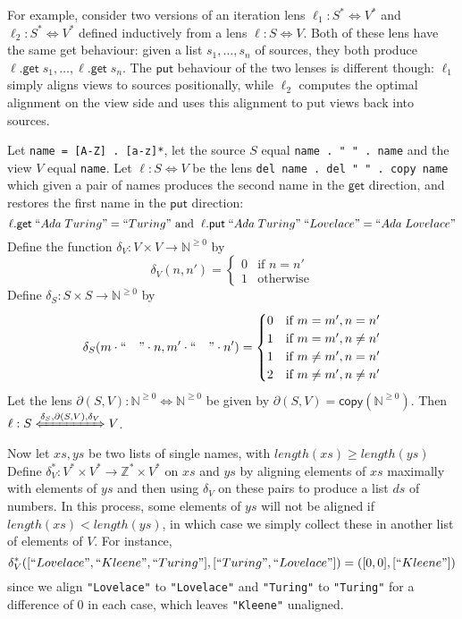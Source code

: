 \documentclass[acmsmall,review,anonymous]{acmart}\settopmatter{printfolios=true,printccs=false,printacmref=false}
\theoremstyle{definition}
\newcommand{\kw}[1]{\ensuremath{\mathsf{#1}}\xspace}
\newcommand{\get}{\ensuremath{\kw{get}}\xspace}
\newcommand{\pput}{\ensuremath{\kw{put}}\xspace}
\newcommand{\ccopy}{\ensuremath{\kw{copy}}\xspace}
\begin{document}
For example, consider two versions of an iteration lens $\ell_1 : S^*
\Leftrightarrow V^*$ and $\ell_2 : S^* \Leftrightarrow V^*$ defined inductively
from a lens $\ell : S \Leftrightarrow V$. Both of these lens have the same get
behaviour: given a list $s_1, \ldots, s_n$ of sources, they both produce
$\ell.\get \; s_1, \ldots, \ell.\get \; s_n$. The \pput behaviour of the two
lenses is different though: $\ell_1$ simply aligns views to sources
positionally, while $\ell_2$ computes the optimal alignment on the view side and
uses this alignment to put views back into sources.

Let \lstinline|name = [A-Z] . [a-z]*|, let the source $S$ equal 
\lstinline|name . " " . name| and the view $V$ equal \lstinline|name|.
Let $\ell : S \Leftrightarrow V$ be the lens
\lstinline|del name . del " " . copy name| which given a pair of names produces
the second name in the \get direction, and restores the first name in the \pput
direction:
$$\ell.\get \; ``Ada \; Turing" = ``Turing" \text{ and }\; \ell.\pput \; ``Ada
\; Turing" \; ``Lovelace" = ``Ada \; Lovelace"$$
Define the
function $\delta_V : V \times V \longrightarrow \mathbb{N}^{\geq 0}$ by 
$$\delta_V(n, n') = 
\begin{cases}
0 & \text{if }n=n'\\
1 & \text{otherwise}
\end{cases}$$
Define $\delta_S : S \times S \longrightarrow \mathbb{N}^{\geq 0}$ by
$$\delta_S(m \cdot `` \quad " \cdot n, m' \cdot `` \quad " \cdot n') =
\begin{cases}
0 & \text{if } m = m', n = n'\\
1 & \text{if } m = m', n \neq n'\\
1 & \text{if } m \neq m', n = n'\\
2 & \text{if } m \neq m', n \neq n'
\end{cases}$$
Let the lens $\partial(S, V) : \mathbb{N}^{\geq 0} \Leftrightarrow
\mathbb{N}^{\geq 0}$ be given by $\partial(S, V) = \ccopy(\mathbb{N}^{\geq
0})$. Then $\ell : S \xLeftrightarrow{\delta_S, \partial(S, V), \delta_V} V$.

Now let $xs, ys$ be two lists of single names, with $length(xs) \geq length(ys)$
Define $\delta_V^* : V^* \times V^* \longrightarrow \mathbb{Z}^* \times V^*$ on $xs$ and
$ys$ by aligning elements of $xs$ maximally with elements of $ys$ and then using $\delta_V$
on these pairs to produce a list $ds$ of numbers. In this process, some elements of
$ys$ will not be aligned if $length(xs) < length(ys)$, in which case we simply collect
these in another list of elements of $V$. For instance,
$$\delta_V^*([``Lovelace", ``Kleene", ``Turing"], [``Turing", ``Lovelace"]) = ([0,0], [``Kleene"])$$
since we align \lstinline|"Lovelace"| to \lstinline|"Lovelace"| and 
\lstinline|"Turing"| to \lstinline|"Turing"| for a difference of 0 in each case, which leaves
\lstinline|"Kleene"| unaligned.
\end{document}

